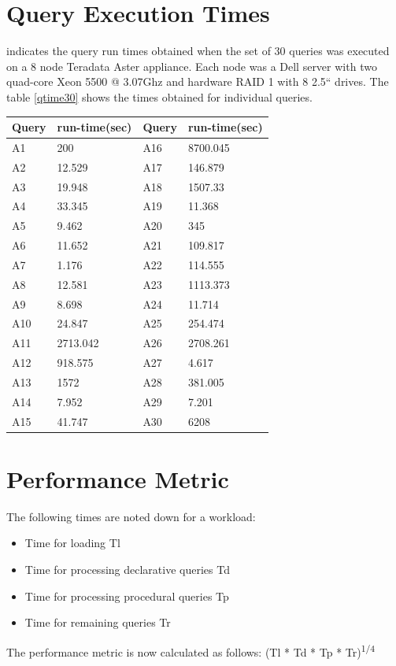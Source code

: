 \documentclass[12pt]{book}
\begin{document}
\section{Query Execution Times}
\cite{springer} indicates the query run times obtained when the set of 30 queries was executed on a 8 node Teradata Aster appliance. 
Each node was a Dell server with two quad-core Xeon 5500 @ 3.07Ghz and hardware RAID 1 with 8 2.5{``} drives. The table \ref{qtime30}
shows the times obtained for individual queries.
\begin{center}
\begin{tabular}{ll||ll}
Query & run-time(sec) & Query & run-time(sec)\\\hline
A1 & 200 & A16 & 8700.045\\
A2 & 12.529 & A17 & 146.879\\
A3 & 19.948 & A18 & 1507.33\\
A4 & 33.345 & A19 & 11.368\\
A5 & 9.462 & A20 & 345\\
A6 & 11.652 & A21 & 109.817\\
A7 & 1.176 & A22 & 114.555\\
A8 & 12.581 & A23 & 1113.373\\
A9 & 8.698 & A24 & 11.714\\
A10 & 24.847 & A25 & 254.474\\
A11 & 2713.042 & A26 & 2708.261\\
A12 & 918.575 & A27 & 4.617\\
A13 & 1572 & A28 & 381.005\\
A14 & 7.952 & A29 & 7.201\\
A15 & 41.747 & A30 & 6208
\end{tabular}
\end{center}

\section{Performance Metric}
The following times are noted down for a workload:
\begin{itemize}
 \item Time for loading Tl
 \item Time for processing declarative queries Td
 \item Time for processing procedural queries Tp
 \item Time for remaining queries Tr
\end{itemize}
The performance metric is now calculated as follows:
\newline
(Tl * Td * Tp * Tr)\textsuperscript{1/4}
\end{document}
